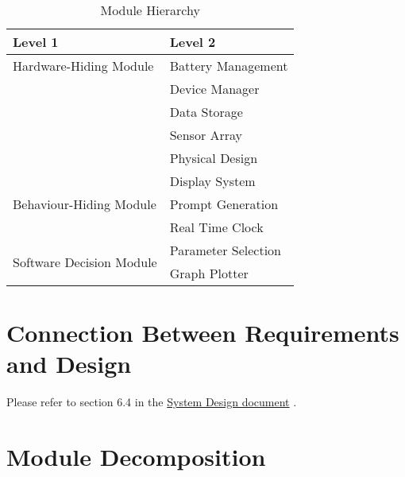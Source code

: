\documentclass[12pt, titlepage]{article}
\begin{document}
\begin{table}[h!]
  \centering
  \begin{tabular}{p{} p{}}
    \toprule
    \textbf{Level 1}                                      & \textbf{Level 2}         \\
    \midrule

    {Hardware-Hiding Module}                              & Battery Management       \\
                                                          & Device Manager           \\
                                                          & Data Storage             \\
                                                          & Sensor Array             \\
							  & Physical Design \\

    \midrule

    \multirow{3}{0.3\textwidth}{Behaviour-Hiding Module}  & Display System           \\
                                                          & Prompt Generation        \\
                                                          & Real Time Clock          \\


    \midrule

    \multirow{3}{0.3\textwidth}{Software Decision Module} & Parameter Selection \\
                                                          & Graph Plotter            \\

    \bottomrule
  \end{tabular}
  \caption{Module Hierarchy}
  \label{TblMH}
\end{table}

\section{Connection Between Requirements and Design} \label{SecConnection}

Please refer to section 6.4 in the \href{https://github.com/zakerl/Capstone_Project/blob/main/docs/Design/SystDesign/SystDes.pdf}{System Design document} .

\section{Module Decomposition} \label{SecMD}
\end{document}

